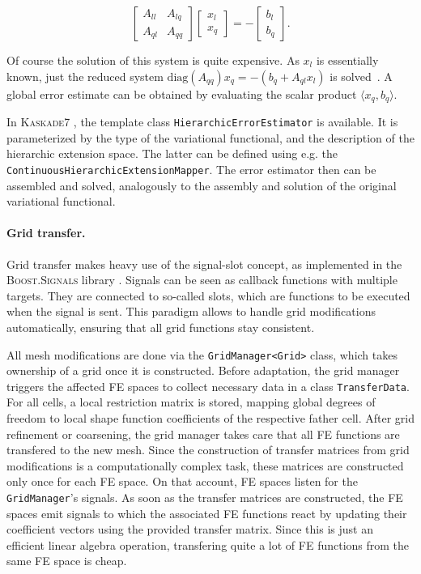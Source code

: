 \documentclass[11pt]{article}
\newcommand{\K}{\textsc{Kaskade7 }}
\begin{document}
\[
 \begin{bmatrix}
    A_{ll} & A_{lq} \\ A_{ql} & A_{qq}
  \end{bmatrix}
  \begin{bmatrix}
    x_l \\ x_q
  \end{bmatrix}
 = -\begin{bmatrix}
    b_l \\ b_q
  \end{bmatrix}.
\]

Of course the solution of this system is quite expensive. As $x_l$ is essentially known, just the reduced system 
$\mathrm{diag}(A_{qq}) x_q = -(b_q+A_{ql}x_l)$ is solved~\cite{DeuflhardLeinenYserentant89}. A global error estimate 
can be obtained by evaluating the scalar product $\langle x_q, b_q \rangle$.

In \K, the template class \verb?HierarchicErrorEstimator? is available. It is parameterized by the type of the 
variational functional, and the description of the hierarchic extension space. The latter can be defined using e.g. 
the \verb?ContinuousHierarchicExtensionMapper?. The error estimator then can be assembled and solved, 
analogously to the assembly and solution of the original variational functional.

\paragraph{Grid transfer.}  Grid transfer makes heavy use of the signal-slot concept, 
as implemented in the \textsc{Boost.Signals} library \cite{boost}. Signals can be seen as callback functions with 
multiple targets. They are connected to so-called slots, which are functions to be executed when the signal is sent. 
This paradigm allows to handle grid modifications automatically, ensuring that all grid functions stay consistent.

All mesh modifications are done via the {\tt GridManager<Grid>} class, which takes ownership of a grid once it is 
constructed.
%
Before adaptation, the grid manager triggers the affected FE spaces to collect necessary data in a class {\tt Transfer\-Data}. 
For all cells, a local restriction matrix is stored, mapping global degrees of freedom to local shape function coefficients 
of the respective father cell.
%
After grid refinement or coarsening, the grid manager takes care that all FE functions are transfered to the new mesh. 
Since the construction of transfer matrices from grid modifications is a computationally complex task, these matrices 
are constructed only once for each FE space. On that account, FE spaces listen for the {\tt GridManager}'s signals. 
As soon as the transfer matrices are constructed, the FE spaces emit signals to which the associated FE functions 
react by updating their coefficient vectors using the provided transfer matrix. Since this is just an efficient linear 
algebra operation, transfering quite a lot of FE functions from the same FE space is cheap.
\end{document}
